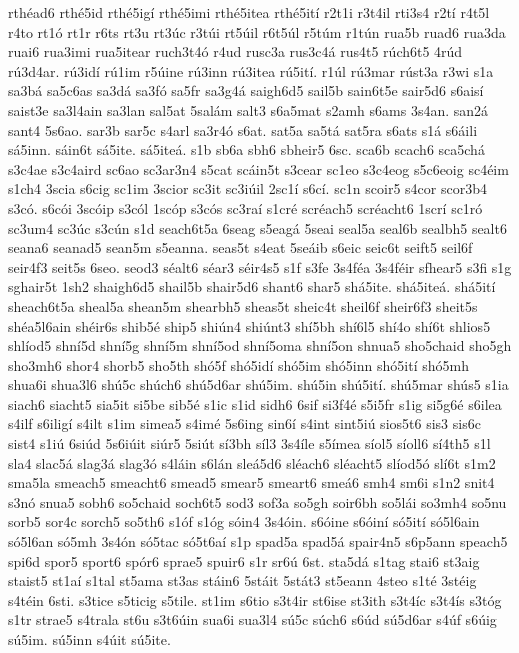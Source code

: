 {rthéad6
rthé5id
rthé5igí
rthé5imi
rthé5itea
rthé5ití
r2t1i
r3t4il
rti3s4
r2tí
r4t5l
r4to
rt1ó
rt1r
r6ts
rt3u
rt3úc
r3túi
rt5úil
r6t5úl
r5túm
r1tún
rua5b
ruad6
rua3da
ruai6
rua3imi
rua5itear
ruch3t4ó
r4ud
rusc3a
rus3c4á
rus4t5
rúch6t5
4rúd
rú3d4ar.
rú3idí
rú1im
r5úine
rú3inn
rú3itea
rú5ití.
r1úl
rú3mar
rúst3a
r3wi
s1a
sa3bá
sa5c6as
sa3dá
sa3fó
sa5fr
sa3g4á
saigh6d5
sail5b
sain6t5e
sair5d6
s6aisí
saist3e
sa3l4ain
sa3lan
sal5at
5salám
salt3
s6a5mat
s2amh
s6ams
3s4an.
san2á
sant4
5s6ao.
sar3b
sar5c
s4arl
sa3r4ó
s6at.
sat5a
sa5tá
sat5ra
s6ats
s1á
s6áili
sá5inn.
sáin6t
sá5ite.
sá5iteá.
s1b
sb6a
sbh6
sbheir5
6sc.
sca6b
scach6
sca5chá
s3c4ae
s3c4aird
sc6ao
sc3ar3n4
s5cat
scáin5t
s3cear
sc1eo
s3c4eog
s5c6eoig
sc4éim
s1ch4
3scia
s6cig
sc1im
3scior
sc3it
sc3iúil
2sc1í
s6cí.
sc1n
scoir5
s4cor
scor3b4
s3có.
s6cói
3scóip
s3cól
1scóp
s3cós
sc3raí
s1cré
scréach5
scréacht6
1scrí
sc1ró
sc3um4
sc3úc
s3cún
s1d
seach6t5a
6seag
s5eagá
5seai
seal5a
seal6b
sealbh5
sealt6
seana6
seanad5
sean5m
s5eanna.
seas5t
s4eat
5seáib
s6eic
seic6t
seift5
seil6f
seir4f3
seit5s
6seo.
seod3
séalt6
séar3
séir4s5
s1f
s3fe
3s4féa
3s4féir
sfhear5
s3fi
s1g
sghair5t
1sh2
shaigh6d5
shail5b
shair5d6
shant6
shar5
shá5ite.
shá5iteá.
shá5ití
sheach6t5a
sheal5a
shean5m
shearbh5
sheas5t
sheic4t
sheil6f
sheir6f3
sheit5s
shéa5l6ain
shéir6s
shib5é
ship5
shiún4
shiúnt3
shí5bh
shí6l5
shí4o
shí6t
shlios5
shlíod5
shní5d
shní5g
shní5m
shní5od
shní5oma
shní5on
shnua5
sho5chaid
sho5gh
sho3mh6
shor4
shorb5
sho5th
shó5f
shó5idí
shó5im
shó5inn
shó5ití
shó5mh
shua6i
shua3l6
shú5c
shúch6
shú5d6ar
shú5im.
shú5in
shú5ití.
shú5mar
shús5
s1ia
siach6
siacht5
sia5it
si5be
sib5é
s1ic
s1id
sidh6
6sif
si3f4é
s5i5fr
s1ig
si5g6é
s6ilea
s4ilf
s6iligí
s4ilt
s1im
simea5
s4imé
5s6ing
sin6í
s4int
sint5iú
sios5t6
sis3
sis6c
sist4
s1iú
6siúd
5s6iúit
siúr5
5siút
sí3bh
síl3
3s4íle
s5ímea
síol5
síoll6
sí4th5
s1l
sla4
slac5á
slag3á
slag3ó
s4láin
s6lán
sleá5d6
sléach6
sléacht5
slíod5ó
slí6t
s1m2
sma5la
smeach5
smeacht6
smead5
smear5
smeart6
smeá6
smh4
sm6i
s1n2
snit4
s3nó
snua5
sobh6
so5chaid
soch6t5
sod3
sof3a
so5gh
soir6bh
so5lái
so3mh4
so5nu
sorb5
sor4c
sorch5
so5th6
s1óf
s1óg
sóin4
3s4óin.
s6óine
s6óiní
só5ití
só5l6ain
só5l6an
só5mh
3s4ón
só5tac
só5t6aí
s1p
spad5a
spad5á
spair4n5
s6p5ann
speach5
spi6d
spor5
sport6
spór6
sprae5
spuir6
s1r
sr6ú
6st.
sta5dá
s1tag
stai6
st3aig
staist5
st1aí
s1tal
st5ama
st3as
stáin6
5stáit
5stát3
st5eann
4steo
s1té
3stéig
s4téin
6sti.
s3tice
s5ticig
s5tile.
st1im
s6tio
s3t4ir
st6ise
st3ith
s3t4íc
s3t4ís
s3tóg
s1tr
strae5
s4trala
st6u
s3t6úin
sua6i
sua3l4
sú5c
súch6
s6úd
sú5d6ar
s4úf
s6úig
sú5im.
sú5inn
s4úit
sú5ite.
}
